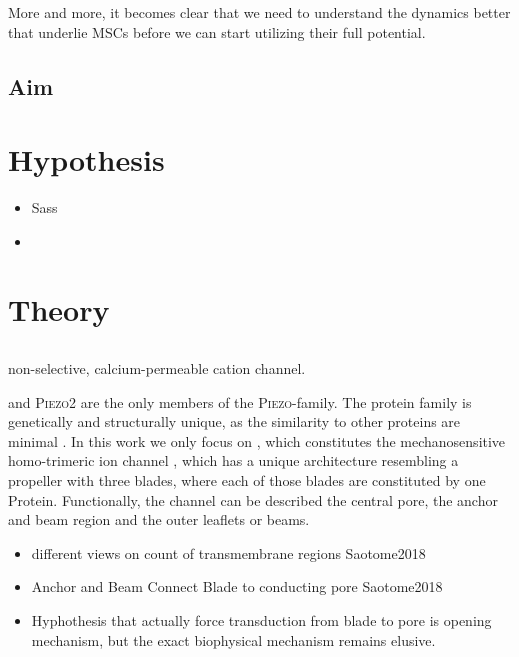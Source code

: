 More and more, it becomes clear that we need to understand the dynamics better that underlie MSCs before we can start utilizing their full potential.\par 

\subsection{Aim}


\section{Hypothesis}

\begin{itemize}
	\item Sass
	\item 
\end{itemize}


\section{Theory}

\subsection{\Piezo{}}


non-selective, calcium-permeable cation channel.

\Piezo{} and \textsc{Piezo2} are the only members of the \textsc{Piezo}-family. The protein family is genetically and structurally unique, as the similarity to other proteins are minimal \cite{Coste2010}. In this work we only focus on \Piezo{}, which constitutes the mechanosensitive homo-trimeric ion channel \Piezo{}, which has a unique architecture resembling a propeller with three blades, where each of those blades are constituted by one \Piezo{} Protein. Functionally, the channel can be described the central pore, the anchor and beam region and the outer leaflets or beams. 

\begin{itemize}
	\item different views on count of transmembrane regions Saotome2018
	\item Anchor and Beam Connect Blade to conducting pore Saotome2018
	\item Hyphothesis that actually force transduction from blade to pore is opening mechanism, but the exact biophysical mechanism remains elusive. 
\end{itemize}

